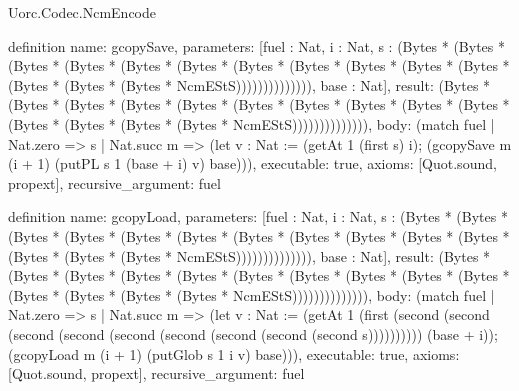 \begin{lexlean}{Uorc.Codec.NcmEncode}
\begin{semanticmodule}
definition{
  name: gcopySave,
  parameters: [fuel : Nat, i : Nat, s : (Bytes * (Bytes * (Bytes * (Bytes * (Bytes * (Bytes * (Bytes * (Bytes * (Bytes * (Bytes * (Bytes * (Bytes * (Bytes * (Bytes * NcmEStS)))))))))))))), base : Nat],
  result: (Bytes * (Bytes * (Bytes * (Bytes * (Bytes * (Bytes * (Bytes * (Bytes * (Bytes * (Bytes * (Bytes * (Bytes * (Bytes * (Bytes * NcmEStS)))))))))))))),
  body: (match fuel
    | Nat.zero => s
    | Nat.succ m => (let v : Nat := (getAt 1 (first s) i); (gcopySave m (i + 1) (putPL s 1 (base + i) v) base))),
  executable: true,
  axioms: [Quot.sound, propext],
  recursive_argument: fuel
}

definition{
  name: gcopyLoad,
  parameters: [fuel : Nat, i : Nat, s : (Bytes * (Bytes * (Bytes * (Bytes * (Bytes * (Bytes * (Bytes * (Bytes * (Bytes * (Bytes * (Bytes * (Bytes * (Bytes * (Bytes * NcmEStS)))))))))))))), base : Nat],
  result: (Bytes * (Bytes * (Bytes * (Bytes * (Bytes * (Bytes * (Bytes * (Bytes * (Bytes * (Bytes * (Bytes * (Bytes * (Bytes * (Bytes * NcmEStS)))))))))))))),
  body: (match fuel
    | Nat.zero => s
    | Nat.succ m => (let v : Nat := (getAt 1 (first (second (second (second (second (second (second (second (second (second s)))))))))) (base + i)); (gcopyLoad m (i + 1) (putGlob s 1 i v) base))),
  executable: true,
  axioms: [Quot.sound, propext],
  recursive_argument: fuel
}


\end{semanticmodule}
\end{lexlean}
